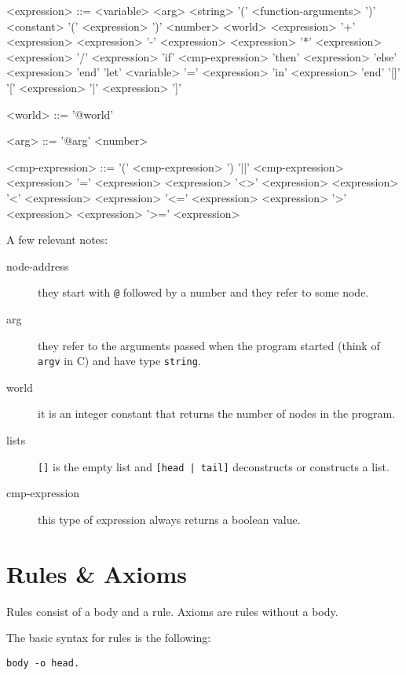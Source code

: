 \documentclass[11pt]{article}
\begin{document}
\begin{grammar}
<expression> ::= <variable>
   \alt <arg>
   \alt <string>
    '(' <function-arguments> ')'
   \alt <constant>
   \alt '(' <expression> ')'
   \alt <number>
   \alt <world>
   \alt <expression> '+' <expression>
   \alt <expression> '-' <expression>
   \alt <expression> '*' <expression>
   \alt <expression> '/' <expression>
   \alt 'if' <cmp-expression> 'then' <expression> 'else' <expression> 'end'
   \alt 'let' <variable> '=' <expression> 'in' <expression> 'end'
   \alt '[]'
   \alt '[' <expression> '|' <expression> ']'

<world> ::= '@world'

<arg> ::= '@arg' <number>

<cmp-expression> ::= '(' <cmp-expression> ')
    '||' <cmp-expression>
   \alt <expression> '=' <expression>
   \alt <expression> '<>' <expression>
   \alt <expression> '\textless' <expression>
   \alt <expression> '\textless=' <expression>
   \alt <expression> '\textgreater' <expression>
   \alt <expression> '\textgreater=' <expression>
\end{grammar}

A few relevant notes:

\begin{description}
\item[node-address] they start with \texttt{@} followed by a number and they refer to some node.
\item[arg] they refer to the arguments passed when the program started (think of \texttt{argv} in C) and have type \texttt{string}.
\item[world] it is an integer constant that returns the number of nodes in the program.
\item[lists] \texttt{[]} is the empty list and \texttt{[head | tail]} deconstructs or constructs a list.
\item[cmp-expression] this type of expression always returns a boolean value.
\end{description}

\section{Rules \& Axioms}

Rules consist of a body and a rule. Axioms are rules without a body.

The basic syntax for rules is the following:

\begin{verbatim}
body -o head.
\end{verbatim}
\end{document}
